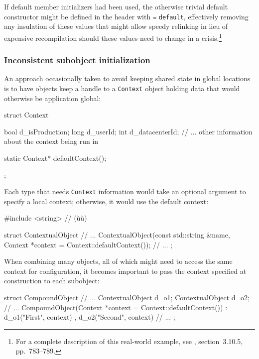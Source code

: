 If default member initializers had been used, the otherwise trivial
default constructor might be defined in the header with \lstinline!=!
\lstinline!default!, effectively removing any insulation of these values
that might allow speedy relinking in lieu of expensive recompilation
should these values need to change in a crisis.{\cprotect\footnote{For a
complete description of this real-world example, see \cite{lakos20},
  section~3.10.5, pp.~783--789.}}

\subsubsection[Inconsistent subobject initialization]{Inconsistent subobject initialization}\label{inconsistent-subobject-initialization}

An approach occasionally taken to avoid keeping shared state in global
locations is to have objects keep a handle to a \lstinline!Context! object
holding data that would otherwise be application global:

\begin{emcppslisting}[emcppsbatch={e6,e7,e8}]
struct Context
{
    bool d_isProduction;
    long d_userId;
    int  d_datacenterId;
    // ... other information about the context being run in

    static Context* defaultContext();
};
\end{emcppslisting}
    

Each type that needs \lstinline!Context! information would take an optional
argument to specify a local context; otherwise, it would use the default
context:

\begin{emcppslisting}[emcppsbatch={e6,e7,e8}]
#include <string>  // (ù{}ù)

struct ContextualObject
{
// ...
     ContextualObject(const std::string &name,
                      Context *context = Context::defaultContext());
// ...
};
\end{emcppslisting}
    

When combining many objects, all of which might need to access the same
context for configuration, it becomes important to pass the context
specified at construction to each subobject:

\begin{emcppslisting}[emcppsbatch=e6]
struct CompoundObject
{
// ...
    ContextualObject d_o1;
    ContextualObject d_o2;
// ...
    CompoundObject(Context *context = Context::defaultContext())
    : d_o1("First", context)
    , d_o2("Second", context)
    { }
// ...
};
\end{emcppslisting}
    

